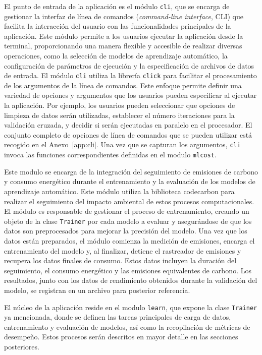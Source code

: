 El punto de entrada de la aplicación es el módulo \texttt{cli}, que se encarga de gestionar la interfaz de línea de comandos (\emph{command-line interface}, CLI) que facilita la interacción del usuario con las funcionalidades principales de la aplicación. Este módulo permite a los usuarios ejecutar la aplicación desde la terminal, proporcionando una manera flexible y accesible de realizar diversas operaciones, como la selección de modelos de aprendizaje automático, la configuración de parámetros de ejecución y la especificación de archivos de datos de entrada. El módulo \texttt{cli} utiliza la librería \texttt{click} para facilitar el procesamiento de los argumentos de la línea de comandos. Este enfoque permite definir una variedad de opciones y argumentos que los usuarios pueden especificar al ejecutar la aplicación. Por ejemplo, los usuarios pueden seleccionar que opciones de limpieza de datos serán utilizadas, establecer el número iteraciones para la validación cruzada, y decidir si serán ejecutadas en paralelo en el procesador. El conjunto completo de opciones de línea de comandos que se pueden utilizar está recogido en el Anexo~\ref{app:cli}. Una vez que se capturan los argumentos, \texttt{cli} invoca las funciones correspondientes definidas en el modulo \texttt{mlcost}.

Este modulo se encarga de la integración del seguimiento de emisiones de carbono y consumo energético durante el entrenamiento y la evaluación de los modelos de aprendizaje automático. Este módulo utiliza la biblioteca codecarbon para realizar el seguimiento del impacto ambiental de estos procesos computacionales. El módulo es responsable de gestionar el proceso de entrenamiento, creando un objeto de la clase \texttt{Trainer} por cada modelo a evaluar y asegurándose de que los datos son preprocesados para mejorar la precisión del modelo. Una vez que los datos están preparados, el módulo comienza la medición de emisiones, encarga el entrenamiento del modelo y, al finalizar, detiene el rastreador de emisiones y recupera los datos finales de consumo. Estos datos incluyen la duración del seguimiento, el consumo energético y las emisiones equivalentes de carbono. Los resultados, junto con los datos de rendimiento obtenidos durante la validación del modelo, se registran en un archivo para posterior referencia.

El núcleo de la aplicación reside en el modulo \texttt{learn}, que expone la clase \texttt{Trainer} ya mencionada, donde se definen las tareas principales de carga de datos, entrenamiento y evaluación de modelos, así como la recopilación de métricas de desempeño. Estos procesos serán descritos en mayor detalle en las secciones posteriores.

